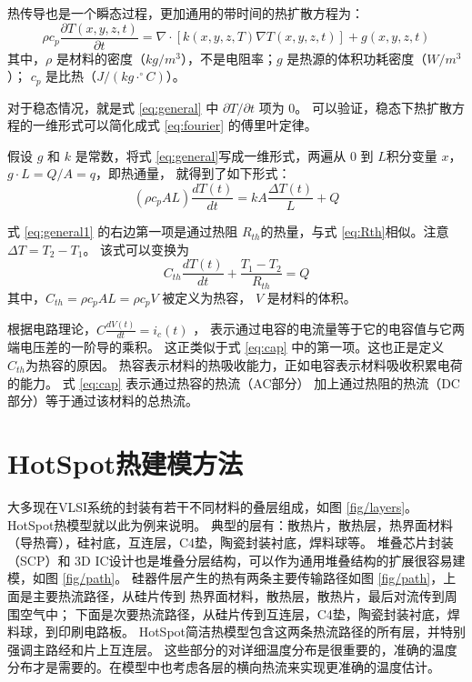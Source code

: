热传导也是一个瞬态过程，更加通用的带时间的热扩散方程为：
\begin{equation}\label{eq:general}
 \rho c_p \frac{\partial T(x,y,z,t)}{\partial t} = \nabla \cdot[k(x,y,z,T)\nabla T(x,y,z,t)] +g(x,y,z,t)
\end{equation}
其中，$\rho$ 是材料的密度（$kg/m^3$），不是电阻率；$g$ 是热源的体积功耗密度（$W/m^3$）；
$c_p$ 是比热（$J/(kg \cdot ^\circ C)$）。

对于稳态情况，就是式 \eqref{eq:general} 中 $\partial T/\partial t $ 项为 0。
可以验证，稳态下热扩散方程的一维形式可以简化成式 \eqref{eq:fourier} 的傅里叶定律。

假设 $g$ 和 $k$ 是常数，将式 \eqref{eq:general}写成一维形式，两遍从 $0$ 到 $L$积分变量 $x$，$g\cdot L = Q/A = q$，即热通量， 就得到了如下形式：
\begin{equation}\label{eq:general1}
 (\rho c_p A L) \frac{d T(t)}{d t} = k A \frac{\Delta T(t)}{L} + Q
\end{equation}

式 \eqref{eq:general1} 的右边第一项是通过热阻 $R_{th}$的热量，与式 \eqref{eq:Rth}相似。注意$\Delta T = T_2 - T_1$。
该式可以变换为
\begin{equation}\label{eq:cap}
 C_{th} \frac{d T(t)}{d t} + \frac{ T_1 -T_2}{R_{th}} = Q
\end{equation}
其中，$C_{th} = \rho c_p A L = \rho c_p V $ 被定义为热容， $V$ 是材料的体积。

根据电路理论，$ C  \frac{d V(t)}{d t} = i_c(t)$ ， 表示通过电容的电流量等于它的电容值与它两端电压差的一阶导的乘积。
这正类似于式 \eqref{eq:cap} 中的第一项。这也正是定义 $C_{th}$为热容的原因。
热容表示材料的热吸收能力，正如电容表示材料吸收积累电荷的能力。
式 \eqref{eq:cap} 表示通过热容的热流（AC部分） 加上通过热阻的热流（DC部分）等于通过该材料的总热流。

\section{HotSpot热建模方法}\label{sec:hotspot}

大多现在VLSI系统的封装有若干不同材料的叠层组成，如图 \ref{fig/layers}。
HotSpot热模型就以此为例来说明。
典型的层有：散热片，散热层，热界面材料（导热膏），硅衬底，互连层，C4垫，陶瓷封装衬底，焊料球等。
堆叠芯片封装（SCP）和 3D IC设计也是堆叠分层结构，可以作为通用堆叠结构的扩展很容易建模，如图 \ref{fig/path}。
硅器件层产生的热有两条主要传输路径如图 \ref{fig/path}，上面是主要热流路径，从硅片传到 热界面材料，散热层，散热片，最后对流传到周围空气中；
下面是次要热流路径，从硅片传到互连层，C4垫，陶瓷封装衬底，焊料球，到印刷电路板。
HotSpot简洁热模型包含这两条热流路径的所有层，并特别强调主路经和片上互连层。
这些部分的对详细温度分布是很重要的，准确的温度分布才是需要的。在模型中也考虑各层的横向热流来实现更准确的温度估计。



